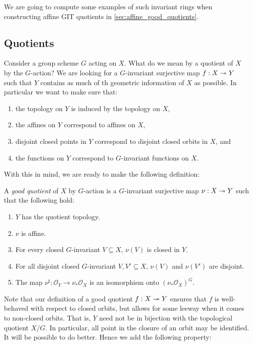 \documentclass[12pt]{ociamthesis}  %
\begin{document}
We are going to compute some examples of such invariant rings when
constructing affine GIT quotients in \ref{sec:affine_good_quotients}.

\subsection{Quotients}

Consider a group scheme $G$ acting on $X$. What do we mean by a
quotient of $X$ by the $G$-action? We are looking for a $G$-invariant
surjective map $f : X\twoheadrightarrow Y$ such that $Y$ contains as much of th
geometric information of $X$ as possible. In particular
we want to make sure that:
\begin{enumerate}
  \item the topology on $Y$ is induced by the topology on $X$,
  \item the affines on $Y$ correspond to affines on $X$,
  \item disjoint closed points in $Y$ correspond to disjoint
        closed orbits in $X$, and
  \item the functions on $Y$ correspond to $G$-invariant functions
        on $X$.
\end{enumerate}
With this in mind, we are ready to make the following definition:

\begin{definition}\label{def:good_quotient}
  A \emph{good quotient} of $X$ by $G$-action is a $G$-invariant
  surjective map $\nu : X\twoheadrightarrow Y$ such that the following hold:
  \begin{enumerate}
    \item $Y$ has the quotient topology.
    \item $\nu$ is affine.
    \item For every closed $G$-invariant $V\subseteq X$,
          $\nu(V)$ is closed in $Y$.
    \item For all disjoint closed $G$-invariant $V,V'\subseteq X$,
          $\nu(V)$ and $\nu(V')$ are disjoint.
    \item The map $\nu^\sharp : \mathscr O_Y \to \nu_*\mathscr O_X$
          is an isomorphism onto $(\nu_*\mathscr O_X)^G$.
  \end{enumerate}
\end{definition}


Note that our definition of a good quotient $f : X\twoheadrightarrow Y$
ensures that $f$ is well-behaved with respect to closed orbits, but
allows for some leeway when it comes to non-closed orbits. That is,
$Y$ need not be in bijection with the topological quotient $X/G$. In particular,
all point in the closure of an orbit may be identified. It will be
possible to do better. Hence we add the following property:
\end{document}

